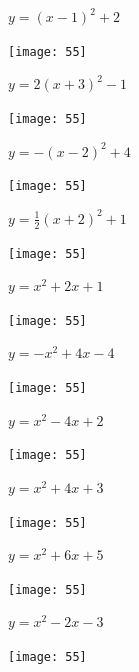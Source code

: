 \documentclass[a4paper]{oblivoir}
\begin{document}
\clearpage
\begin{minipage}{0.45\textwidth}\centering
\(y=(x-1)^2+2\)
\par\bigskip\texttt{[image: 55]}
\end{minipage}
\begin{minipage}{0.45\textwidth}\centering
\(y=2(x+3)^2-1\)
\par\bigskip\texttt{[image: 55]}
\end{minipage}\bigskip\bigskip\par
\begin{minipage}{0.45\textwidth}\centering
\(y=-(x-2)^2+4\)
\par\bigskip\texttt{[image: 55]}
\end{minipage}
\begin{minipage}{0.45\textwidth}\centering
\(y=\frac12(x+2)^2+1\)
\par\bigskip\texttt{[image: 55]}
\end{minipage}\bigskip\bigskip\par

\clearpage
\begin{minipage}{0.45\textwidth}\centering
\(y=x^2+2x+1\)
\par\bigskip\texttt{[image: 55]}
\end{minipage}
\begin{minipage}{0.45\textwidth}\centering
\(y=-x^2+4x-4\)
\par\bigskip\texttt{[image: 55]}
\end{minipage}\bigskip\bigskip\par
\begin{minipage}{0.45\textwidth}\centering
\(y=x^2-4x+2\)
\par\bigskip\texttt{[image: 55]}
\end{minipage}
\begin{minipage}{0.45\textwidth}\centering
\(y=x^2+4x+3\)
\par\bigskip\texttt{[image: 55]}
\end{minipage}\bigskip\bigskip\par
\begin{minipage}{0.45\textwidth}\centering
\(y=x^2+6x+5\)
\par\bigskip\texttt{[image: 55]}
\end{minipage}
\begin{minipage}{0.45\textwidth}\centering
\(y=x^2-2x-3\)
\par\bigskip\texttt{[image: 55]}
\end{minipage}\bigskip\bigskip\par
\end{document}

